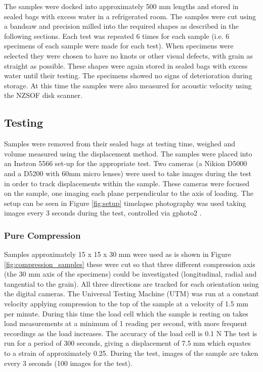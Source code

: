 \documentclass[10pt]{article}
\begin{document}
The samples were docked into approximately 500 mm lengths and stored in sealed bags with excess water in a refrigerated room. The samples were cut using a bandsaw and precision milled into the required shapes as described in the following sections. Each test was repeated 6 times for each sample (i.e. 6 specimens of each sample were made for each test). When specimens were selected they were chosen to have no knots or other visual defects, with grain as straight as possible. These shapes were again stored in sealed bags with excess water until their testing. The specimens showed no signs of deterioration during storage. At this time the samples were also measured for acoustic velocity  using the NZSOF disk scanner.

\subsection{Testing}
Samples were removed from their sealed bags at testing time, weighed and volume measured using the displacement method. The samples were placed into an Instron 5566 set-up for the appropriate test. Two cameras (a Nikion D5000 and a D5200 with 60mm micro lenses) were used to take images during the test in order to track displacements within the sample. These cameras were focused on the sample, one imaging each plane perpendicular to the axis of loading. The setup can be seen in Figure \ref{fig:setup} timelapse photography was used taking images every 3 seconds during the test, controlled via gphoto2 \citep{contributors_gphoto2_2002}.

\subsubsection{Pure Compression}
Samples approximately 15 x 15 x 30 mm were used as is shown in Figure \ref{fig:compression_samples} these were cut so that three different compression axis (the 30 mm axis of the specimens) could be investigated (longitudinal, radial and tangential to the grain). All three directions are tracked for each orientation using the digital cameras.
The Universal Testing Machine (UTM) was run at a constant velocity applying compression to the top of the sample at a velocity of 1.5 mm per minute. During this time the load cell which the sample is resting on takes load measurements at a minimum of 1 reading per second, with more frequent recordings as the load increases. The accuracy of the load cell is 0.1 N The test is run for a period of 300 seconds, giving a displacement of 7.5 mm which equates to a strain of approximately 0.25. During the test, images of the sample are taken every 3 seconds (100 images for the test).
\end{document}

